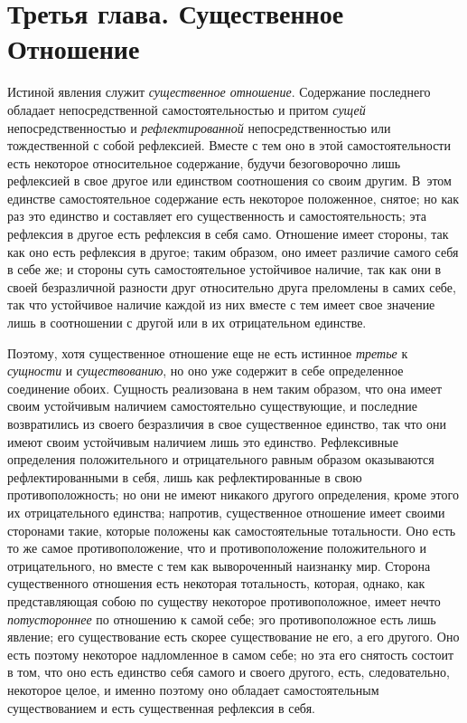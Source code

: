 \chapter[{\em Третья глава} Существенное Отношение]
{Третья глава. Существенное Отношение}

Истиной явления служит {\em существенное отношение}. Содержание последнего
обладает непосредственной самостоятельностью и притом
{\em сущей} непосредственностью и
{\em рефлектированной} непосредственностью или
тождественной с собой рефлексией. Вместе с тем оно в этой самостоятельности
есть некоторое относительное содержание, будучи безоговорочно лишь
рефлексией в свое другое или единством соотношения со своим другим. В~этом
единстве самостоятельное содержание есть некоторое положенное, снятое; но
как раз это единство и составляет его существенность и самостоятельность;
эта рефлексия в другое есть рефлексия в себя само. Отношение имеет стороны,
так как оно есть рефлексия в другое; таким образом, оно имеет различие
самого себя в себе же; и стороны суть самостоятельное устойчивое наличие,
так как они в своей безразличной разности друг относительно друга
преломлены в самих себе, так что устойчивое наличие каждой из них вместе с
тем имеет свое значение лишь в соотношении с другой или в их отрицательном
единстве.

Поэтому, хотя существенное отношение еще не есть истинное
{\em третье} к {\em сущности} и
{\em существованию}, но оно уже содержит в себе
определенное соединение обоих. Сущность реализована в нем таким образом,
что она имеет своим устойчивым наличием самостоятельно существующие, и
последние возвратились из своего безразличия в свое существенное единство,
так что они имеют своим устойчивым наличием лишь это единство. Рефлексивные
определения положительного и отрицательного равным образом оказываются
рефлектированными в себя, лишь как рефлектированные в свою
противоположность; но они не имеют никакого другого определения, кроме
этого их отрицательного единства; напротив, существенное отношение имеет
своими сторонами такие, которые положены как самостоятельные тотальности.
Оно есть то же самое противоположение, что и противоположение
положительного и отрицательного, но вместе с тем как вывороченный наизнанку
мир. Сторона существенного отношения есть некоторая тотальность, которая,
однако, как представляющая собою по существу некоторое противоположное,
имеет нечто {\em потустороннее} по отношению к самой
себе; эго противоположное есть лишь явление; его существование есть скорее
существование не его, а его другого. Оно есть поэтому некоторое
надломленное в самом себе; но эта его снятость состоит в том, что оно есть
единство себя самого и своего другого, есть, следовательно, некоторое
целое, и именно поэтому оно обладает самостоятельным существованием и есть
существенная рефлексия в себя.

